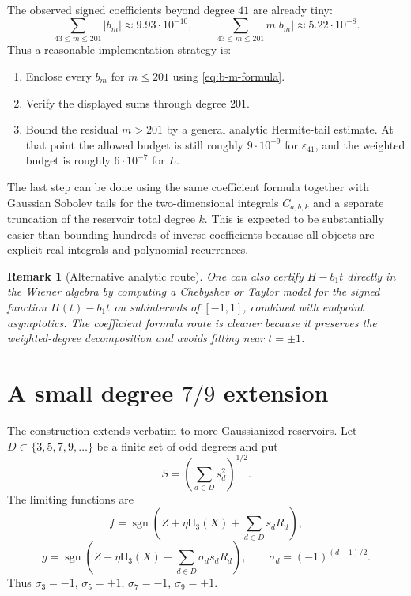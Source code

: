 \documentclass[11pt]{article}
\newtheorem{remark}[theorem]{Remark}
\newcommand{\1}{\mathbf{1}}
\newcommand{\sgn}{\operatorname{sgn}}
\newcommand{\Herm}{\mathsf H}
\newcommand{\eps}{\varepsilon}
\newcommand{\abs}[1]{\left\lvert #1\right\rvert}
\begin{document}
The observed signed coefficients beyond degree \(41\) are already tiny:
\[
        \sum_{43\le m\le201}\abs{b_m}\approx9.93\cdot10^{-10},
        \qquad
        \sum_{43\le m\le201}m\abs{b_m}\approx5.22\cdot10^{-8}.
\]
Thus a reasonable implementation strategy is:
\begin{enumerate}[label=\textbf{T\arabic*.}, leftmargin=0.8in]
\item Enclose every \(b_m\) for \(m\le201\) using \eqref{eq:b-m-formula}.
\item Verify the displayed sums through degree \(201\).
\item Bound the residual \(m>201\) by a general analytic Hermite-tail estimate.  At that point the allowed budget is still roughly \(9\cdot10^{-9}\) for \(\eps_{41}\), and the weighted budget is roughly \(6\cdot10^{-7}\) for \(L\).
\end{enumerate}

The last step can be done using the same coefficient formula together with Gaussian Sobolev tails for the two-dimensional integrals \(C_{a,b,k}\) and a separate truncation of the reservoir total degree \(k\).  This is expected to be substantially easier than bounding hundreds of inverse coefficients because all objects are explicit real integrals and polynomial recurrences.

\begin{remark}[Alternative analytic route]
One can also certify \(H-b_1t\) directly in the Wiener algebra by computing a Chebyshev or Taylor model for the signed function \(H(t)-b_1t\) on subintervals of \([-1,1]\), combined with endpoint asymptotics.  The coefficient formula route is cleaner because it preserves the weighted-degree decomposition and avoids fitting near \(t=\pm1\).
\end{remark}

\section{A small degree \texorpdfstring{\(7/9\)}{7/9} extension}

The construction extends verbatim to more Gaussianized reservoirs.  Let \(D\subset\{3,5,7,9,\ldots\}\) be a finite set of odd degrees and put
\[
        S=\left(\sum_{d\in D}s_d^2\right)^{1/2}.
\]
The limiting functions are
\[
        f=\sgn\left(Z+\eta\Herm_3(X)+\sum_{d\in D}s_dR_d\right),
\]
\[
        g=\sgn\left(Z-\eta\Herm_3(X)+\sum_{d\in D}\sigma_d s_dR_d\right),
        \qquad
        \sigma_d=(-1)^{(d-1)/2}.
\]
Thus \(\sigma_3=-1\), \(\sigma_5=+1\), \(\sigma_7=-1\), \(\sigma_9=+1\).
\end{document}
